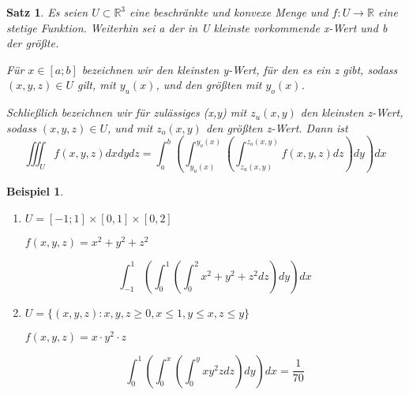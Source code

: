 \documentclass[12pt,a4paper]{scrreprt}
\newtheorem{beispiel}[defi]{Beispiel}
\newtheorem{satz}[defi]{Satz}
\begin{document}
	\begin{satz}
		Es seien $U\subset\mathbb{R}^3$ eine beschränkte und konvexe Menge und $f:U\to\mathbb{R}$ eine stetige Funktion. Weiterhin sei a der in U kleinste vorkommende x-Wert und b der größte.

		Für $x\in[a;b]$ bezeichnen wir den kleinsten y-Wert, für den es ein z gibt, sodass $(x,y,z)\in U$ gilt, mit $y_u(x)$, und den größten mit $y_o(x)$.

		Schließlich bezeichnen wir für zulässiges (x,y) mit $z_u(x,y)$ den kleinsten z-Wert, sodass $(x,y,z)\in U$, und mit $z_o(x,y)$ den größten z-Wert. Dann ist
		\[\iiint_U f(x,y,z)dxdydz=\int_a^b \left(\int_{y_u(x)}^{y_o(x)} \left(\int_{z_u(x,y)}^{z_o(x,y)} f(x,y,z)dz\right)dy\right)dx\]
	\end{satz}

	\begin{beispiel}
		\begin{enumerate}
			\item $U=[-1;1]\times[0,1]\times[0,2]$
			
			$f(x,y,z)=x^2+y^2+z^2$

			$$\int_{-1}^1 \left(\int_0^1 \left(\int_0^2 x^2+y^2+z^2dz \right)dy \right)dx$$

			\item $U=\{(x,y,z):x,y,z \ge 0,x \le 1,y \le x,z \le y\}$
			
			$f(x,y,z)=x\cdot y^2 \cdot z$
			
			$$\int_0^1 \left(\int_0^x \left(\int_0^y xy^2zdz \right)dy \right)dx=\frac{1}{70}$$
		\end{enumerate}
	\end{beispiel}
\end{document}
